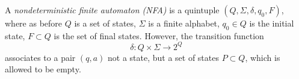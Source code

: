\begin{dfn}
A \emph{nondeterministic finite automaton (NFA)} is a quintuple $(Q, \Sigma, \delta, q_0, F)$, where as before
$Q$ is a set of states, $\Sigma$ is a finite alphabet, $q_0 \in Q$ is the initial state, $F \subset Q$ is the set of final states.
However, the transition function
\[
\delta \colon Q \times \Sigma \to 2^Q
\]
associates to a pair $(q,a)$ not a state, but a set of states $P \subset Q$, which is allowed to be empty.
\end{dfn}